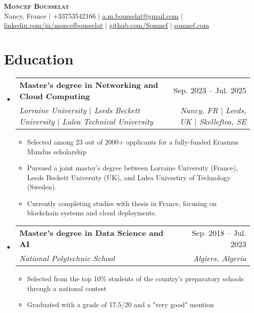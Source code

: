 \documentclass[letterpaper,11t]{article}
\makeatletter
\newcommand{\resumeItem}[1]{
  \item\small{
    {#1 \vspace{-2pt}}
  }
}
\newcommand{\resumeSubheading}[4]{
  \vspace{-2pt}\item
    \begin{tabular*}{0.97\textwidth}[t]{l@{\extracolsep{\fill}}r}
      \textbf{#1} & #2 \\
      \textit{\small#3} & \textit{\small #4} \\
    \end{tabular*}\vspace{-7pt}
}
\newcommand{\resumeSubHeadingListStart}{\begin{itemize}[leftmargin=0.15in, label={}]}
\newcommand{\resumeSubHeadingListEnd}{\end{itemize}}
\newcommand{\resumeItemListStart}{\begin{itemize}}
\newcommand{\resumeItemListEnd}{\end{itemize}\vspace{-5pt}}
\makeatother
\begin{document}

\begin{center}
    \textbf{\Huge \scshape Moncef Bousselat} \\ \vspace{1pt}
    \small Nancy, France $|$ 
    \small +33753542166 $|$ 
    \href{mailto:a.m.bousselat@gmail.com@gmail.com}{\underline{a.m.bousselat@gmail.com}} $|$ 
    \href{https://www.linkedin.com/in/moncefbousselat/}{\underline{linkedin.com/in/moncefbousselat}} $|$
    \href{https://github.com/Somnef}{\underline{github.com/Somnef}} $|$
    \href{https://www.somnef.com}{\underline{somnef.com}}
\end{center}


\section{Education}
    \resumeSubHeadingListStart
        \resumeSubheading
        {Master's degree in Networking and Cloud Computing}{Sep. 2023 -- Jul. 2025}
        {Lorraine University $|$ Leeds Beckett University $|$ Lulea Technical University}{Nancy, FR $|$ Leeds, UK $|$ Skelleftea, SE}
            \resumeItemListStart
                \resumeItem{Selected among 23 out of 2000+ applicants for a fully-funded Erasmus Mundus scholarship}
                \resumeItem{Pursued a joint master's degree between Lorraine University (France), Leeds Beckett University (UK), and Lulea Univestiry of Technology (Sweden).}
                \resumeItem{Currently completing studies with thesis in France, focusing on blockchain systems and cloud deployments.}
            \resumeItemListEnd
      
        \resumeSubheading
        {Master's degree in Data Science and AI}{Sep. 2018 -- Jul. 2023}
        {National Polytechnic School}{Algiers, Algeria}
            \resumeItemListStart
                \resumeItem{Selected from the top 10\% students of the country's preparatory schools through a national contest}
                \resumeItem{Graduated with a grade of 17.5/20 and a "very good" mention}
            \resumeItemListEnd
  \resumeSubHeadingListEnd
\end{document}

